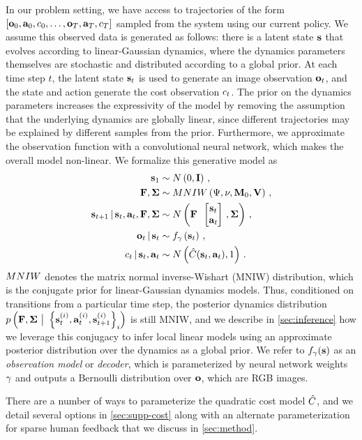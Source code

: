\sloppy In our problem setting, we have access to trajectories of the form 
$\left[\mathbf{o}_0,\mathbf{a}_0,c_0,\ldots,\mathbf{o}_{T},\mathbf{a}_{T},c_{T}\right]$ sampled from the system using our current policy. We assume this observed data is generated as follows: there is a latent state $\mathbf{s}$ that evolves according to linear-Gaussian dynamics, where the dynamics parameters themselves are stochastic and distributed according to a global prior. At each time step $t$, the latent state $\mathbf{s}_t$ is used to generate an image observation $\mathbf{o}_t$, and the state and action generate the cost observation $c_t$. The prior on the dynamics parameters increases the expressivity of the model by removing the assumption that the underlying dynamics are globally linear, since different trajectories may be explained by different samples from the prior. Furthermore, we approximate the observation function with a convolutional neural network, which makes the overall model non-linear. We formalize this generative model as
\begin{align}
    \state_1&\sim\N\left(0,\mathbf{I}\right)\,,\label{eq:gm-start}\\
    \dynmat,\dyncovar&\sim\MNIW\left(\Psi,\nu,\mathbf{M}_0,\mathbf{V}\right)\,,\label{eq:dyn}\\
    \state_{t+1}\given\state_t,\action_t,\dynmat,\dyncovar&\sim\N\left(\dynmat\colvec{\state_t\\\action_t},\dyncovar\right)\,,\label{eq:dyn2}\\
    \observation_t\given\state_t&\sim\decoder_\gamma\left(\state_t\right)\,,\\
    \costsample_t\given\state_t,\action_t&\sim\N\left(\costmodel(\state_t,\action_t),1\right)\,.\label{eq:gm-end}
\end{align}
$MNIW$ denotes the matrix normal inverse-Wishart (MNIW) distribution, which is the conjugate prior for linear-Gaussian dynamics models. Thus, conditioned on transitions from a particular time step, the posterior dynamics distribution $p\left(\mathbf{F},\bm{\Sigma}~\big|~\left\{\mathbf{s}^{(i)}_t,\mathbf{a}^{(i)}_t,\mathbf{s}^{(i)}_{t+1}\right\}_i\right)$ is still MNIW, and we describe in \autoref{sec:inference} how we leverage this conjugacy to infer local linear models using an approximate posterior distribution over the dynamics as a global prior. We refer to $f_\gamma(\mathbf{s})$ as an \emph{observation model} or \emph{decoder}, which is parameterized by neural network weights $\gamma$ and outputs a Bernoulli distribution over $\mathbf{o}$, which are RGB images.

There are a number of ways to parameterize the quadratic cost model $\hat{C}$, and we detail several options in \autoref{sec:supp-cost} along with an alternate parameterization for sparse human feedback that we discuss in \autoref{sec:method}.

